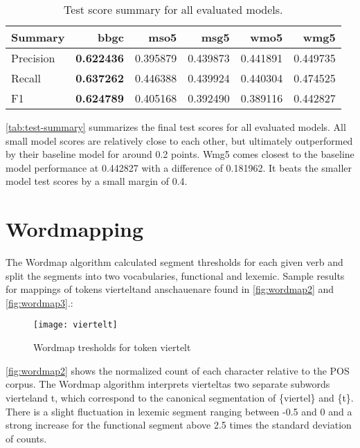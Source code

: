 \begin{table}[H]
    \centering
    \caption{Test score summary for all evaluated models.}
    \label{tab:test-summary}
    \begin{tabular}{lrrrrr}
        \toprule
        \textbf{Summary} & \textbf{bbgc} & \textbf{mso5} & \textbf{msg5} & \textbf{wmo5} & \textbf{wmg5} \\
        \midrule
        Precision & \textbf{0.622436} & 0.395879 & 0.439873 & 0.441891 & 0.449735 \\
        Recall & \textbf{0.637262} & 0.446388 & 0.439924 & 0.440304 & 0.474525 \\
        F1 & \textbf{0.624789} & 0.405168 & 0.392490 & 0.389116 & 0.442827 \\
        \bottomrule
    \end{tabular}
\end{table}

\autoref{tab:test-summary} summarizes the final test scores for all evaluated models.
All small model scores are relatively close to each other, but ultimately outperformed by their baseline model for around 0.2 points.
Wmg5 comes closest to the baseline model performance at 0.442827 with a difference of 0.181962.
It beats the smaller model test scores by a small margin of 0.4.


\section{Wordmapping}
\label{sec:wordmapping}

The Wordmap algorithm calculated segment thresholds for each given verb and split the segments into two vocabularies, functional and lexemic.
Sample results for mappings of tokens \textquotesingle viertelt\textquotesingle and \textquotesingle anschauen\textquotesingle are found in \autoref{fig:wordmap2} and \autoref{fig:wordmap3}.:

\begin{figure}[H]
    \centering
    \texttt{[image: viertelt]}
    \caption[Wordmap for \textquotesingle viertelt\textquotesingle]{Wordmap tresholds for token \textquotesingle viertelt\textquotesingle}
    \label{fig:wordmap2}
\end{figure}

\autoref{fig:wordmap2} shows the normalized count of each character relative to the POS corpus.
The Wordmap algorithm interprets \textquotesingle viertelt\textquotesingle as two separate subwords \textquotesingle viertel\textquotesingle and \textquotesingle t\textquotesingle , which correspond to the canonical segmentation of \{viertel\} and \{t\}.
There is a slight fluctuation in lexemic segment ranging between -0.5 and 0 and a strong increase for the functional segment above 2.5 times the standard deviation of counts.

